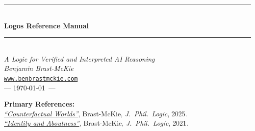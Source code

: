 \documentclass[11pt]{article}
\theoremstyle{definition}
\theoremstyle{plain}
\theoremstyle{remark}
\newcommand{\HRule}{\rule{\linewidth}{0.5mm}}
\begin{document}
\begin{titlepage}
\begin{center}

\vspace*{2cm}

\HRule\\[0.4cm]
{\Huge \bfseries Logos Reference Manual}\\[0.2cm]
\HRule\\[1cm]

{\LARGE\itshape A Logic for Verified and Interpreted AI Reasoning}\\[1cm]


{\large\itshape Benjamin Brast-McKie}\\[0.15cm]
\texttt{\href{https://www.benbrastmckie.com}{www.benbrastmckie.com}}\\[0.15cm]
{--- \today\ ---}\\[1cm]

\vfill

{\normalsize\bfseries Primary References:}\\[0.3cm]
\href{https://link.springer.com/article/10.1007/s10992-025-09793-8}{\textit{``Counterfactual Worlds''}}, Brast-McKie, \textit{J.~Phil.~Logic}, 2025.\\[0.2cm]
\href{https://link.springer.com/article/10.1007/s10992-021-09612-w}{\textit{``Identity and Aboutness''}}, Brast-McKie, \textit{J.~Phil.~Logic}, 2021.\\[1cm]

\end{center}
\end{titlepage}
\thispagestyle{empty}

{

\begin{abstract}
\noindent
This reference manual provides the formal specification of the Logos logic system.
Logos is a hyperintensional modal-temporal logic with exact truthmaker semantics,
designed for reasoning about necessity, possibility, time, and counterfactual
conditionals. The semantics extends from a mereological state space foundation
through increasingly expressive extensions.
\end{abstract}

\pagestyle{empty}
\tableofcontents
\cleardoublepage
}

\end{document}
